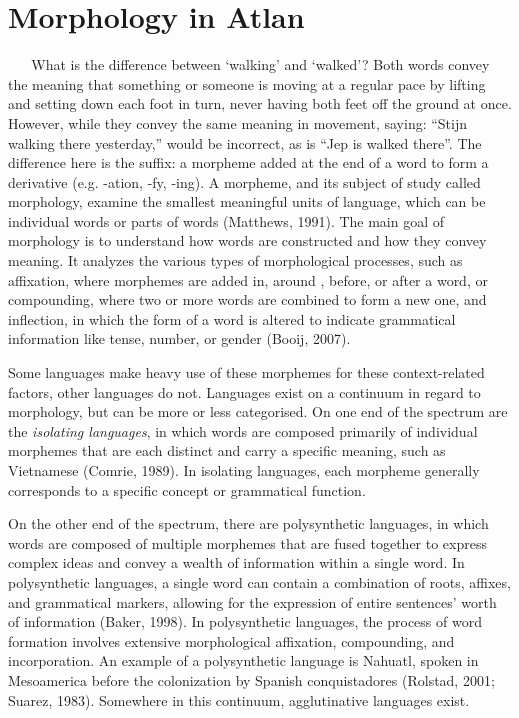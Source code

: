 \section{Morphology in Atlan} 
  
\noindent What is the difference between ‘walking’ and ‘walked’? Both words convey the meaning that something or someone is moving at a regular pace by lifting and setting down each foot in turn, never having both feet off the ground  at once. However, while they convey the same meaning in movement, saying: “Stijn walking there yesterday,” would be incorrect, as is “Jep is walked there”. The difference here is the suffix: a morpheme added at the end of a word to form a derivative (e.g. -ation, -fy, -ing). A morpheme, and its subject of study called morphology, examine the smallest meaningful units of language, which can be individual words or parts of words (Matthews, 1991). The main goal of morphology is to understand how words are constructed and how they convey meaning. It analyzes the various types of morphological processes, such as affixation, where morphemes are added in, around , before, or after a word, or compounding, where two or more words are combined to form a new one, and inflection, in which the form of a word is altered to indicate grammatical information like tense, number, or gender (Booij, 2007). 

Some languages make heavy use of these morphemes for these context-related factors, other languages do not. Languages exist on a continuum in regard to morphology, but can be more or less categorised. On one end of the spectrum are the {\it isolating languages}, in which words are composed primarily of individual morphemes that are each distinct and carry a specific meaning, such as Vietnamese (Comrie, 1989). In isolating languages, each morpheme generally corresponds to a specific concept or grammatical function. 

On the other end of the spectrum, there are polysynthetic languages, in which words are composed of multiple morphemes that are fused together to express complex ideas and convey a wealth of information within a single word. In polysynthetic languages, a single word can contain a combination of roots, affixes, and grammatical markers, allowing for the expression of entire sentences' worth of information (Baker, 1998). In polysynthetic languages, the process of word formation involves extensive morphological affixation, compounding, and incorporation. An example of a polysynthetic language is Nahuatl, spoken in Mesoamerica before the colonization by Spanish conquistadores (Rolstad, 2001; Suarez, 1983). Somewhere in this continuum, agglutinative languages exist. 

